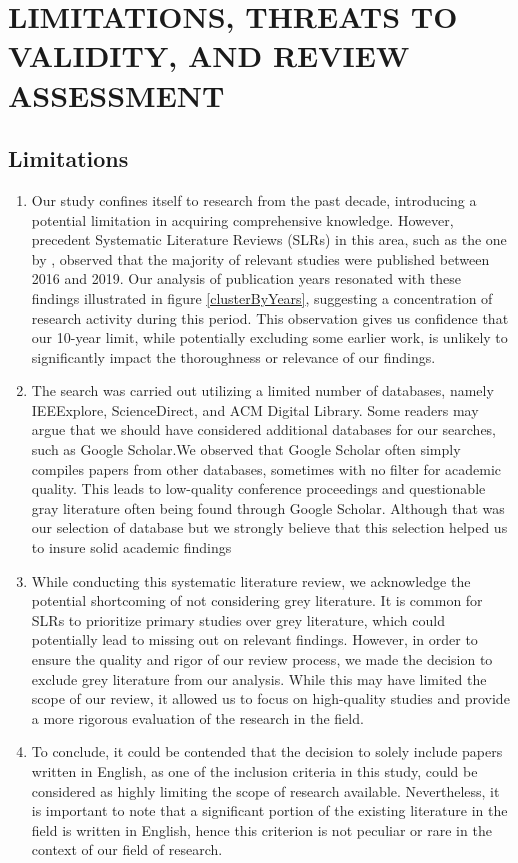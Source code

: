 \section{LIMITATIONS, THREATS TO VALIDITY, AND REVIEW ASSESSMENT}
\label{LIMITATIONS, THREATS TO VALIDITY, AND REVIEW ASSESSMENT}
\subsection{Limitations}
\label{limitation}
\begin{enumerate}

\item Our study confines itself to research from the past decade, introducing a potential limitation in acquiring comprehensive knowledge. However, precedent Systematic Literature Reviews (SLRs) in this area, such as the one by \cite{AI_IN_Education_SLR}, observed that the majority of relevant studies were published between 2016 and 2019. Our analysis  of publication years resonated with these findings illustrated in figure \ref{clusterByYears}, suggesting a concentration of research activity during this period. This observation gives us confidence that our 10-year limit, while potentially excluding some earlier work, is unlikely to significantly impact the thoroughness or relevance of our findings.

\item The search was carried out utilizing a limited number of databases, namely IEEExplore, ScienceDirect, and ACM Digital Library. Some readers may argue that we should have considered additional databases for our searches, such as Google Scholar.We observed that Google Scholar often simply compiles papers from other databases, sometimes with no filter for academic quality. This leads to low-quality conference proceedings and questionable gray literature often being found through Google Scholar. Although that was our selection of database but we strongly believe that this selection helped us to insure solid academic findings 


    \item While conducting this systematic literature review, we acknowledge the potential shortcoming of not considering grey literature. It is common for SLRs to prioritize primary studies over grey literature, which could potentially lead to missing out on relevant findings. However, in order to ensure the quality and rigor of our review process, we made the decision to exclude grey literature from our analysis. While this may have limited the scope of our review, it allowed us to focus on high-quality studies and provide a more rigorous evaluation of the research in the field.

    \item To conclude, it could be contended that the decision to solely include papers written in English, as one of the inclusion criteria in this study, could be considered as highly limiting the scope of research available. Nevertheless, it is important to note that a significant portion of the existing literature in the field is written in English, hence this criterion is not peculiar or rare in the context of our field of research.


\end{enumerate}

